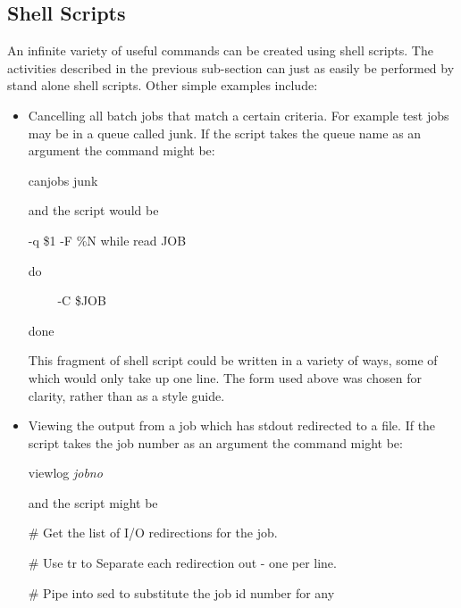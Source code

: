 \subsection{Shell Scripts}
An infinite variety of useful commands can be created using shell scripts. The activities described in the previous sub-section can just
as easily be performed by stand alone shell scripts. Other simple examples include:

\begin{itemize}
\item Cancelling all batch jobs that match a certain criteria. For example test jobs may be in a queue called junk. If the script takes
the queue name as an argument the command might be:

\begin{expara}

canjobs junk

\end{expara}

and the script would be

\begin{expara}

\BtjlistName{} -q \$1 -F {\textquotedbl}\%N{\textquotedbl} {\textbar} while read JOB

do

\ \ \ \ \BtjchangeName{} -C \$JOB

done

\end{expara}

This fragment of shell script could be written in a variety of ways, some of which would only take up one line. The form used above was
chosen for clarity, rather than as a style guide. \item Viewing the output from a job which has stdout redirected to a
file. If the script takes the job number as an argument the command might be:

\begin{expara}

viewlog \textit{jobno}

\end{expara}

and the script might be

\begin{exparasmall}

\# Get the list of I/O redirections for the job.

\# Use tr to Separate each redirection out - one per line.

\# Pipe into sed to substitute the job id number for any


\end{exparasmall}
\end{itemize}
